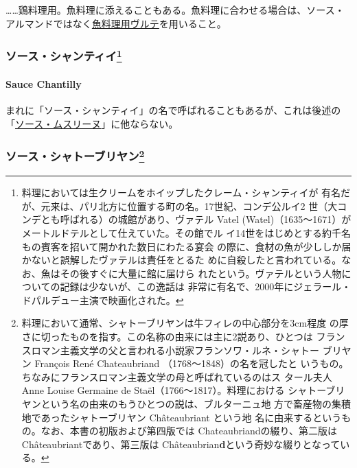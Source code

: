 \begin{recette}
\ldots{}\ldots{}鶏料理用。魚料理に添えることもある。魚料理に合わせる場合は、ソース・
アルマンドではなく\protect\hyperlink{veloute-de-poisson}{魚料理用ヴルテ}を用いること。

\maeaki

\hypertarget{ux30bdux30fcux30b9ux30b7ux30e3ux30f3ux30c6ux30a3ux30a422}{%
\subsubsection[ソース・シャンティイ]{\texorpdfstring{ソース・シャンティイ\footnote{料理においては生クリームをホイップしたクレーム・シャンティイが
  有名だが、元来は、パリ北方に位置する町の名。17世紀、コンデ公ルイ2
  世（大コンデとも呼ばれる）の城館があり、ヴァテル Vatel
  (Watel)（1635〜1671）がメートルドテルとして仕えていた。その館でル
  イ14世をはじめとする約千名もの賓客を招いて開かれた数日にわたる宴会
  の際に、食材の魚が少ししか届かないと誤解したヴァテルは責任をとるた
  めに自殺したと言われている。なお、魚はその後すぐに大量に館に届けら
  れたという。ヴァテルという人物についての記録は少ないが、この逸話は
  非常に有名で、2000年にジェラール・ドパルデュー主演で映画化された。}}{ソース・シャンティイ}}\label{ux30bdux30fcux30b9ux30b7ux30e3ux30f3ux30c6ux30a3ux30a422}}

\hypertarget{sauce-chantilly}{%
\paragraph{Sauce Chantilly}\label{sauce-chantilly}}


まれに「ソース・シャンティイ」の名で呼ばれることもあるが、これは後述の
「\protect\hyperlink{sauce-mousseline}{ソース・ムスリーヌ}」に他ならない。

\maeaki

\hypertarget{ux30bdux30fcux30b9ux30b7ux30e3ux30c8ux30fcux30d6ux30eaux30e4ux30f323}{%
\subsubsection[ソース・シャトーブリヤン]{\texorpdfstring{ソース・シャトーブリヤン\footnote{料理において通常、シャトーブリヤンは牛フィレの中心部分を3cm程度
  の厚さに切ったものを指す。この名称の由来には主に2説あり、ひとつは
  フランスロマン主義文学の父と言われる小説家フランソワ・ルネ・シャトー
  ブリヤン François René Chateaubriand （1768〜1848）の名を冠したと
  いうもの。ちなみにフランスロマン主義文学の母と呼ばれているのはス
  タール夫人Anne Louise Germaine de Staël（1766〜1817）。料理における
  シャトーブリヤンという名の由来のもうひとつの説は、ブルターニュ地
  方で畜産物の集積地であったシャトーブリヤン Châteaubriant という地
  名に由来するというもの。なお、本書の初版および第四版では
  Chateaubriandの綴り、第二版はChâteaubriantであり、第三版は
  Châteaubrian\textbf{d}という奇妙な綴りとなっている。}}{ソース・シャトーブリヤン}}\label{ux30bdux30fcux30b9ux30b7ux30e3ux30c8ux30fcux30d6ux30eaux30e4ux30f323}}


\end{recette}
